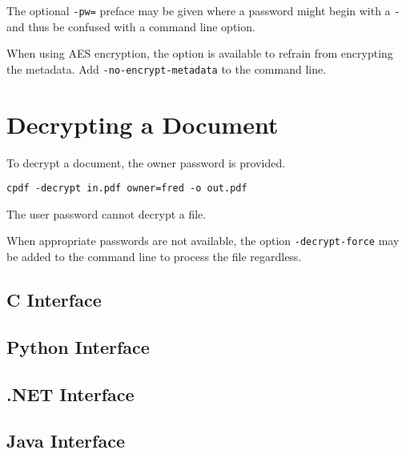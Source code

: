 \documentclass{book}
\begin{document}
The optional \texttt{-pw=} preface may be given where a password might begin with a \texttt{-} and thus be confused with a command line option.

When using AES encryption, the option is available to refrain from encrypting the
metadata. Add \texttt{-no-encrypt-metadata} to the command line.

  \section{Decrypting a Document}
  To decrypt a document, the owner password is provided.
  \begin{framed}
    \small\verb!cpdf -decrypt in.pdf owner=fred -o out.pdf!
  \end{framed}
  \noindent The user password cannot decrypt a file.

When appropriate passwords are not available, the option \texttt{-decrypt-force} may be added to the command line to process the file regardless.


\begin{cpdflib}
\clearpage
\section*{C Interface}
\begin{small}\tt

\end{small}
\end{cpdflib}

\begin{pycpdflib}
\clearpage
\section*{Python Interface}
\begin{small}\tt

\end{small}
\end{pycpdflib}

\begin{dotnetcpdflib}
\clearpage
\section*{.NET Interface}
\begin{small}\tt

\end{small}
\end{dotnetcpdflib}

\begin{jcpdflib}
\clearpage
\section*{Java Interface}
\begin{small}\tt

\end{small}
\end{jcpdflib}
\end{document}

